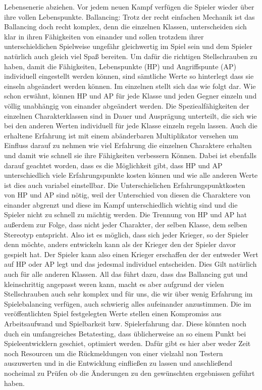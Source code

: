 Lebensenerie abziehen. Vor jedem neuen Kampf verfügen die Spieler wieder über ihre vollen Lebenspunkte. 
Ballancing: Trotz der recht einfachen Mechanik ist das Ballancing doch recht komplex, denn die einzelnen Klassen, unterscheiden sich klar in ihren Fähigkeiten von einander und sollen trotzdem ihrer unterschieldichen Spielweise ungefähr gleichwertig im Spiel sein und dem Spieler natürlich auch gleich viel Spaß bereiten. Um dafür die richtigen Stellschrauben zu haben, damit die Fähigkeiten, Lebenspunkte (HP) und Angriffspunte (AP) individuell eingestellt werden können, sind sämtliche Werte so hinterlegt dass sie einseln abgeändert werden können. Im einzelnen stellt sich das wie folgt dar. Wie schon erwähnt, können HP und AP für jede Klasse und jeden Gegner einzeln und völlig unabhängig von einander abgeändert werden. Die Speziealfähigkeiten der einzelnen Charakterklassen sind in Dauer und Ausprägung unterteilt, die sich wie bei den anderen Werten individuell für jede Klasse einzeln regeln lassen. Auch die erhaltene Erfahrung ist mit einem abänderbaren Multiplikator versehen um Einfluss darauf zu nehmen wie viel Erfahrung die einzelnen Charaktere erhalten und damit wie schnell sie ihre Fähigkeiten verbessern Können. Dabei ist ebenfalls darauf geachtet worden, dass es die Möglichkeit gibt, dass HP und AP unterschiedlich viele Erfahrungspunkte kosten können und wie alle anderen Werte ist dies auch variabel einstellbar. Die Unterschielichen Erfahrungspunktkosten von HP und AP sind nötig, weil der Unterschied von diesen die Charaktere von einander abgrenzt und diese im Kampf unterschiedlich wichtig sind und die Spieler nicht zu schnell zu mächtig werden.
Die Trennung von HP und AP hat außerdem zur Folge, dass nicht jeder Charakter, der selben Klasse, dem selben Stereotyp entspricht. Also ist es möglich, dass sich jeder Krieger, so der Spieler denn möchte, anders entwickeln kann als der Krieger den der Spieler davor gespielt hat. Der Spieler kann also einen Krieger erschaffen der der entweder Wert auf HP oder AP legt und das jedesmal individuel entscheiden. Dies Gilt natürlich auch für alle anderen Klassen. All das führt dazu, dass das Ballancing gut und kleinschrittig angepasst weren kann, macht es aber aufgrund der vielen Stellschrauben auch sehr komplex und für uns, die wir über wenig Erfahrung im Spielebalancing verfügen, auch schwierig alles aufeinander anzustimmen. Die im veröffentlichten Spiel festgelegten Werte stellen einen Kompromiss aus Arbeitsaufwand und Spielbarkeit bzw. Spielerfahrung dar. Diese könnten noch duch ein umfangreiches Betatesting, dass üblicherweise an so einem Punkt bei Spieleentwicklern geschiet, optimiert werden. Dafür gibt es hier aber weder Zeit noch Resourcen um die Rückmeldungen von einer vielzahl non Testern auszuwerten und in die Entwicklung einfließen zu lassen und anschließend nocheimal zu Prüfen ob die Änderungen zu den gewünschten ergebnissen geführt haben.
